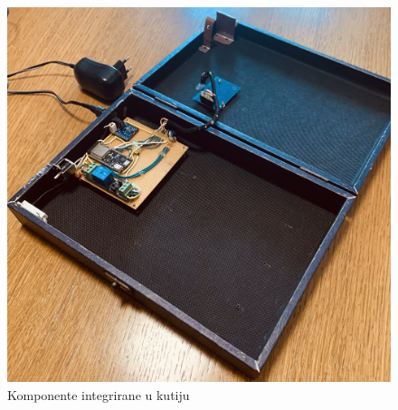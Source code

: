 \begin{figure}[h!]
    \centering
    \includegraphics[width=\textwidth]{images/integrated-components}
    \caption{Komponente integrirane u kutiju}
\end{figure}
